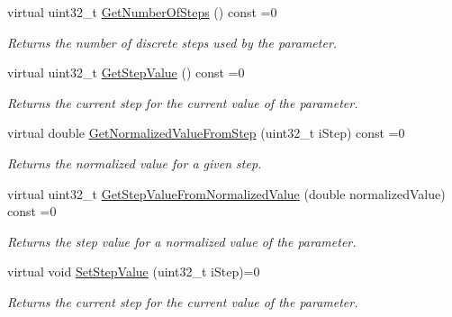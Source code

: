 \begin{Indent}
\begin{DoxyCompactItemize}
virtual uint32\+\_\+t \mbox{\hyperlink{a01857_af2a4893e048666aca929846e7b5634cd}{Get\+Number\+Of\+Steps}} () const =0
\begin{DoxyCompactList}\small\item\em Returns the number of discrete steps used by the parameter. \end{DoxyCompactList}\item 
virtual uint32\+\_\+t \mbox{\hyperlink{a01857_ad4fc7431439f53cc0253d191b19db00b}{Get\+Step\+Value}} () const =0
\begin{DoxyCompactList}\small\item\em Returns the current step for the current value of the parameter. \end{DoxyCompactList}\item 
virtual double \mbox{\hyperlink{a01857_a793cc6ffe2688f26e2afb8277e07ade6}{Get\+Normalized\+Value\+From\+Step}} (uint32\+\_\+t i\+Step) const =0
\begin{DoxyCompactList}\small\item\em Returns the normalized value for a given step. \end{DoxyCompactList}\item 
virtual uint32\+\_\+t \mbox{\hyperlink{a01857_a5ff847bf1730bda6c91189aba8969557}{Get\+Step\+Value\+From\+Normalized\+Value}} (double normalized\+Value) const =0
\begin{DoxyCompactList}\small\item\em Returns the step value for a normalized value of the parameter. \end{DoxyCompactList}\item 
virtual void \mbox{\hyperlink{a01857_a9f92e51fce44dbf25a7265286c72d0ea}{Set\+Step\+Value}} (uint32\+\_\+t i\+Step)=0
\begin{DoxyCompactList}\small\item\em Returns the current step for the current value of the parameter. \end{DoxyCompactList}\end{DoxyCompactItemize}
\end{Indent}
